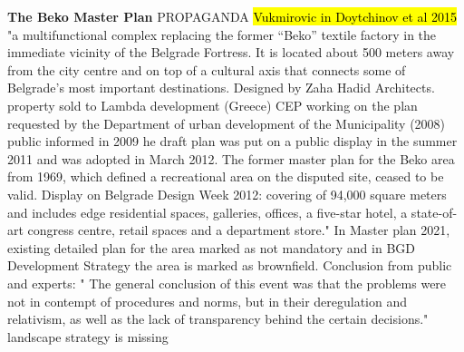 \documentclass[11pt]{report}
\begin{document}
\textbf{The Beko Master Plan}
PROPAGANDA
	\hl{Vukmirovic in Doytchinov et al 2015}
"a multifunctional complex replacing the former “Beko” textile factory in the immediate vicinity of the Belgrade Fortress. It is located about 500 meters away from the city centre and on top of a cultural axis that connects some of Belgrade’s most important destinations. Designed by Zaha Hadid Architects.
property sold to Lambda development (Greece)
CEP working on the plan requested by the Department of urban development of the Municipality (2008)
public informed in 2009
he draft plan was put on a public display in the summer 2011 and was 
adopted in March 2012. The former master plan for the Beko area from 1969, 
which defined a recreational area on the disputed site, ceased to be valid.
Display on Belgrade Design Week 2012: covering of 94,000 square meters and includes edge residential spaces, galleries, offices, a five-star hotel, 
a  state-of-art  congress  centre,  retail  spaces  and  a department store."
In Master plan 2021, existing detailed plan for the area marked as not mandatory and in BGD Development Strategy the area is marked as brownfield.
Conclusion from public and experts: " The general conclusion of this event was that the problems were not in contempt of procedures and norms, but in 
their deregulation and relativism, as well as the lack of transparency behind the certain decisions."
landscape strategy is missing
\end{document}

